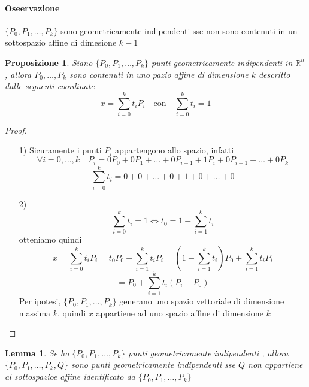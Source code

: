 \documentclass[a4paper]{report}
\newtheorem{proposition}{Proposizione}
\newtheorem{lemma}{Lemma}
\newcommand{\R}{\ensuremath{\mathbb{R}}}
\newcommand{\geoind}[1]{geometricamente indipendent{#1} }
\newcommand{\pointset}{\ensuremath{\{P_0,P_1,\dots,P_k\}} }
\begin{document}
\paragraph{Oseervazione} $\{P_0,P_1,\dots,P_k\}$ sono \geoind{i} sse non sono contenuti in un sottospazio affine di dimesione $k-1$
\begin{proposition}
    Siano $\{P_0,P_1,\dots,P_k\}$ punti \geoind{i} in $\R^n$, allora $P_0,\dots,P_k$ sono contenuti in uno pazio affine di dimensione $k$ descritto dalle seguenti coordinate
    \[
        x=\sum_{i=0}^k t_iP_i\quad\text{con}\quad\sum_{i=0}^k t_i=1
    \]
\end{proposition}
\begin{proof}
    \begin{enumerate}
        \item[1)] Sicuramente i punti $P_i$ appartengono allo spazio, infatti
            \[
                \forall i=0,\dots,k\quad P_i=0P_0+0P_1+\dots+0P_{i-1}+1P_i+0P_{i+1}+\dots+0P_k
            \]
            \[
                \sum_{i=0}^k t_i=0+0+\dots+0+1+0+\dots+0
            \]
        \item[2)]
            \[
                \sum_{i=0}^k t_i=1\Longleftrightarrow t_0=1-\sum_{i=1}^k t_i
            \]
            otteniamo quindi
            \[
                x=\sum_{i=0}^k t_iP_i=t_0P_0+\sum_{i=1}^kt_iP_i=\left(1-\sum_{i=1}^k t_i\right)P_0+\sum_{i=1}^k t_iP_i
            \]
            \[
                =P_0+\sum_{i=1}^k t_i(P_i-P_0)
            \]
            Per ipotesi, \pointset generano uno spazio vettoriale di dimensione massima $k$, quindi $x$ appartiene ad uno spazio affine di dimensione $k$
    \end{enumerate}
\end{proof}
\begin{lemma}
    Se ho \pointset punti \geoind{i}, allora $\{P_0,P_1,\dots,P_k,Q\}$ sono punti \geoind{i} sse $Q$ non appartiene al sottospazioe affine identificato da \pointset
\end{lemma}
\end{document}
